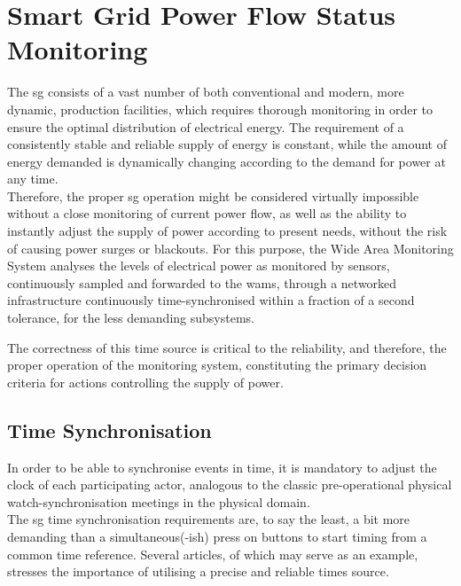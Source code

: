 \chapter{Smart Grid Power Flow Status Monitoring}

The \acrshort{sg} consists of a vast number of both conventional and modern, more dynamic, production facilities, which requires thorough monitoring in order to ensure the optimal distribution of electrical energy. The requirement of a consistently stable and reliable supply of energy is constant, while the amount of energy demanded is dynamically changing according to the demand for power at any time. \\ 

Therefore, the proper \acrlong{sg} operation might be considered virtually impossible without a  close monitoring of current power flow, as well as the ability to instantly adjust the supply of power according to present needs,  without the risk of causing power surges or blackouts. For this purpose, the Wide Area Monitoring System analyses the levels of electrical power as monitored by sensors, continuously sampled and forwarded to the \acrshort{wams}, through  a networked infrastructure continuously time-synchronised within a fraction of a second tolerance, for the less demanding subsystems.


The correctness of this time source is critical to the reliability, and therefore, the proper operation of the monitoring system, constituting the primary decision criteria for actions controlling the supply of power.




\section{Time Synchronisation}

In order to be able to synchronise events in time, it is mandatory to adjust the clock of each participating actor, analogous to the classic pre-operational physical watch-synchronisation meetings in the physical domain. \\ 

The \acrshort{sg} time synchronisation requirements are, to say the least, a bit more demanding than a simultaneous(-ish) press on buttons to start timing from a common time reference.
Several articles, of which \cite{appasani2018review} may serve as an example, stresses the importance of utilising a precise and reliable times source.

